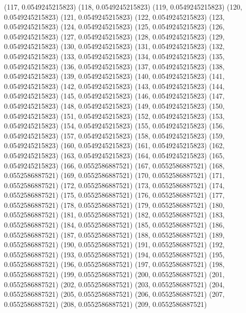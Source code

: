 {					(117, 0.0549245215823)
					(118, 0.0549245215823)
					(119, 0.0549245215823)
					(120, 0.0549245215823)
					(121, 0.0549245215823)
					(122, 0.0549245215823)
					(123, 0.0549245215823)
					(124, 0.0549245215823)
					(125, 0.0549245215823)
					(126, 0.0549245215823)
					(127, 0.0549245215823)
					(128, 0.0549245215823)
					(129, 0.0549245215823)
					(130, 0.0549245215823)
					(131, 0.0549245215823)
					(132, 0.0549245215823)
					(133, 0.0549245215823)
					(134, 0.0549245215823)
					(135, 0.0549245215823)
					(136, 0.0549245215823)
					(137, 0.0549245215823)
					(138, 0.0549245215823)
					(139, 0.0549245215823)
					(140, 0.0549245215823)
					(141, 0.0549245215823)
					(142, 0.0549245215823)
					(143, 0.0549245215823)
					(144, 0.0549245215823)
					(145, 0.0549245215823)
					(146, 0.0549245215823)
					(147, 0.0549245215823)
					(148, 0.0549245215823)
					(149, 0.0549245215823)
					(150, 0.0549245215823)
					(151, 0.0549245215823)
					(152, 0.0549245215823)
					(153, 0.0549245215823)
					(154, 0.0549245215823)
					(155, 0.0549245215823)
					(156, 0.0549245215823)
					(157, 0.0549245215823)
					(158, 0.0549245215823)
					(159, 0.0549245215823)
					(160, 0.0549245215823)
					(161, 0.0549245215823)
					(162, 0.0549245215823)
					(163, 0.0549245215823)
					(164, 0.0549245215823)
					(165, 0.0549245215823)
					(166, 0.0552586887521)
					(167, 0.0552586887521)
					(168, 0.0552586887521)
					(169, 0.0552586887521)
					(170, 0.0552586887521)
					(171, 0.0552586887521)
					(172, 0.0552586887521)
					(173, 0.0552586887521)
					(174, 0.0552586887521)
					(175, 0.0552586887521)
					(176, 0.0552586887521)
					(177, 0.0552586887521)
					(178, 0.0552586887521)
					(179, 0.0552586887521)
					(180, 0.0552586887521)
					(181, 0.0552586887521)
					(182, 0.0552586887521)
					(183, 0.0552586887521)
					(184, 0.0552586887521)
					(185, 0.0552586887521)
					(186, 0.0552586887521)
					(187, 0.0552586887521)
					(188, 0.0552586887521)
					(189, 0.0552586887521)
					(190, 0.0552586887521)
					(191, 0.0552586887521)
					(192, 0.0552586887521)
					(193, 0.0552586887521)
					(194, 0.0552586887521)
					(195, 0.0552586887521)
					(196, 0.0552586887521)
					(197, 0.0552586887521)
					(198, 0.0552586887521)
					(199, 0.0552586887521)
					(200, 0.0552586887521)
					(201, 0.0552586887521)
					(202, 0.0552586887521)
					(203, 0.0552586887521)
					(204, 0.0552586887521)
					(205, 0.0552586887521)
					(206, 0.0552586887521)
					(207, 0.0552586887521)
					(208, 0.0552586887521)
					(209, 0.0552586887521)
}

